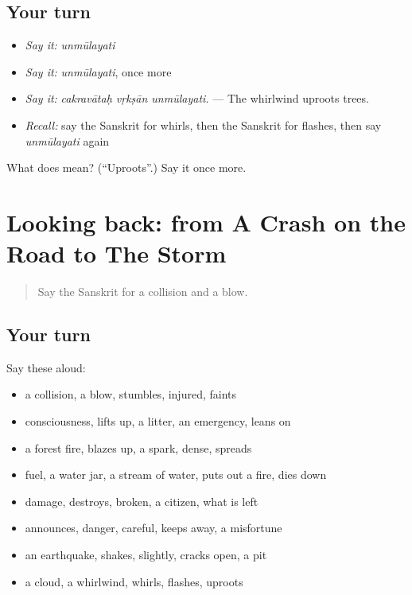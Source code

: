 \subsection*{Your turn}
\begin{itemize}
\raggedright
  \item \emph{Say it:} \emph{unmūlayati}
  \item \emph{Say it:} \emph{unmūlayati}, once more
  \item \emph{Say it:} \emph{cakravātaḥ vṛkṣān unmūlayati.} — The whirlwind uproots trees.
  \item \emph{Recall:} say the Sanskrit for whirls, then the Sanskrit for flashes, then say \emph{unmūlayati} again
\end{itemize}

\begin{tcolorbox}[breakable,colback=teal!4,colframe=teal!35!black,title={Before you move on}]
What does  mean? (\textquotedblleft{}Uproots\textquotedblright{}.) Say it once more.
\end{tcolorbox}
\section[(dialogue)]{Looking back: from A Crash on the Road to The Storm}

\label{lesson:SA-R301-review-294-301}



\begin{quote}
Say the Sanskrit for a collision and a blow.
\end{quote}

\subsection*{Your turn}
Say these aloud:

\begin{itemize}
\raggedright
  \item a collision, a blow, stumbles, injured, faints
  \item consciousness, lifts up, a litter, an emergency, leans on
  \item a forest fire, blazes up, a spark, dense, spreads
  \item fuel, a water jar, a stream of water, puts out a fire, dies down
  \item damage, destroys, broken, a citizen, what is left
  \item announces, danger, careful, keeps away, a misfortune
  \item an earthquake, shakes, slightly, cracks open, a pit
  \item a cloud, a whirlwind, whirls, flashes, uproots
\end{itemize}

